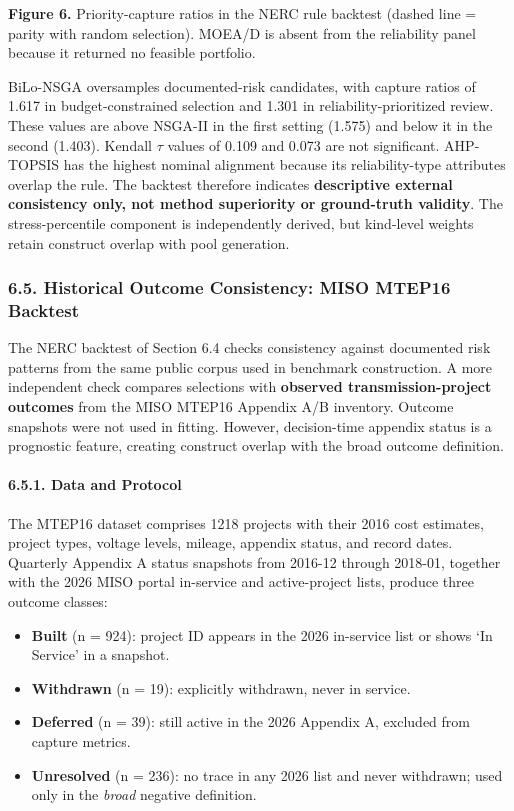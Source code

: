 \documentclass[
]{article}
\providecommand{\tightlist}{%
  \setlength{\itemsep}{0pt}\setlength{\parskip}{0pt}}
\begin{document}
\textbf{Figure 6.} Priority-capture ratios in the NERC rule backtest (dashed line = parity with random selection). MOEA/D is absent from the reliability panel because it returned no feasible portfolio.

BiLo-NSGA oversamples documented-risk candidates, with capture ratios of 1.617 in budget-constrained selection and 1.301 in reliability-prioritized review. These values are above NSGA-II in the first setting (1.575) and below it in the second (1.403). Kendall \(\tau\) values of 0.109 and 0.073 are not significant. AHP-TOPSIS has the highest nominal alignment because its reliability-type attributes overlap the rule. The backtest therefore indicates \textbf{descriptive external consistency only, not method superiority or ground-truth validity}. The stress-percentile component is independently derived, but kind-level weights retain construct overlap with pool generation.

\subsubsection{6.5. Historical Outcome Consistency: MISO MTEP16 Backtest}\label{historical-outcome-consistency-miso-mtep16-backtest}

The NERC backtest of Section 6.4 checks consistency against documented risk patterns from the same public corpus used in benchmark construction. A more independent check compares selections with \textbf{observed transmission-project outcomes} from the MISO MTEP16 Appendix A/B inventory. Outcome snapshots were not used in fitting. However, decision-time appendix status is a prognostic feature, creating construct overlap with the broad outcome definition.

\paragraph{6.5.1. Data and Protocol}\label{data-and-protocol}

The MTEP16 dataset comprises 1218 projects with their 2016 cost estimates, project types, voltage levels, mileage, appendix status, and record dates. Quarterly Appendix A status snapshots from 2016-12 through 2018-01, together with the 2026 MISO portal in-service and active-project lists, produce three outcome classes:

\begin{itemize}
\tightlist
\item
  \textbf{Built} (n = 924): project ID appears in the 2026 in-service list or shows `In Service' in a snapshot.
\item
  \textbf{Withdrawn} (n = 19): explicitly withdrawn, never in service.
\item
  \textbf{Deferred} (n = 39): still active in the 2026 Appendix A, excluded from capture metrics.
\item
  \textbf{Unresolved} (n = 236): no trace in any 2026 list and never withdrawn; used only in the \emph{broad} negative definition.
\end{itemize}
\end{document}
